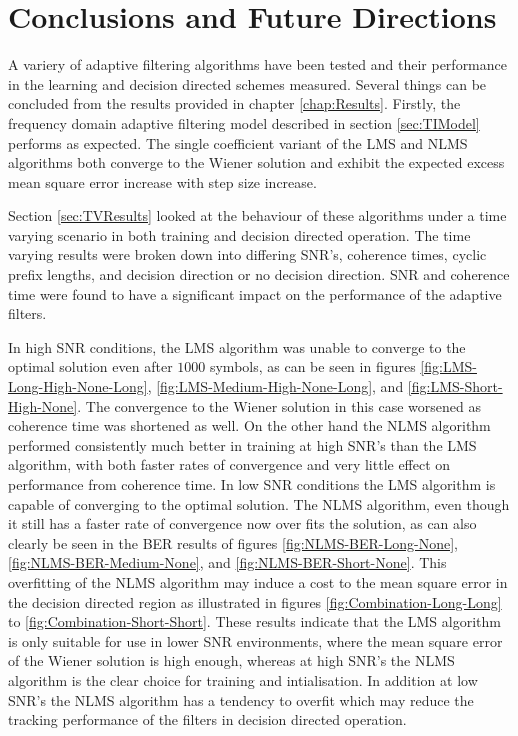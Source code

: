 \chapter{Conclusions and Future Directions}
\label{chap:Conclusion}

A variery of adaptive filtering algorithms have been tested %
and their performance in the learning and decision directed %
schemes measured. Several things can be concluded from %
the results provided in chapter \ref{chap:Results}. Firstly, %
the frequency domain adaptive filtering model described in %
section \ref{sec:TIModel} performs as expected. The single coefficient %
variant of the LMS and NLMS algorithms both converge to %
the Wiener solution and exhibit the expected excess %
mean square error increase with step size increase.

Section \ref{sec:TVResults} looked at the behaviour %
of these algorithms under a time varying scenario in %
both training and decision directed operation. The %
time varying results were broken down into %
differing SNR's, coherence times, cyclic prefix lengths, %
and decision direction or no decision direction. SNR and %
coherence time were found to have a significant impact %
on the performance of the adaptive filters.

In high SNR conditions, the LMS algorithm was unable %
to converge to the optimal solution even after $1000$ %
symbols, as can be seen in figures \ref{fig:LMS-Long-High-None-Long}, %
\ref{fig:LMS-Medium-High-None-Long}, and %
\ref{fig:LMS-Short-High-None}. The convergence to the %
Wiener solution in this case worsened as coherence %
time was shortened as well. On the other hand the NLMS algorithm %
performed consistently much better in training at high SNR's %
than the LMS algorithm, with both faster rates of convergence and %
very little effect on performance from coherence time. In low %
SNR conditions the LMS algorithm is capable of converging %
to the optimal solution. The NLMS algorithm, even though it %
still has a faster rate of convergence now over fits the solution, %
as can also clearly be seen in the BER results of figures %
\ref{fig:NLMS-BER-Long-None}, \ref{fig:NLMS-BER-Medium-None}, 
and \ref{fig:NLMS-BER-Short-None}. This overfitting of the NLMS %
algorithm may induce a cost to the mean square error in the decision %
directed region as illustrated in figures \ref{fig:Combination-Long-Long} %
to \ref{fig:Combination-Short-Short}. These results %
indicate that the LMS algorithm is only suitable for use in %
lower SNR environments, where the mean square error %
of the Wiener solution is high enough, whereas at high %
SNR's the NLMS algorithm is the clear choice for training and %
intialisation. In addition at low SNR's the NLMS algorithm %
has a tendency to overfit which may reduce the tracking %
performance of the filters in decision directed operation.

